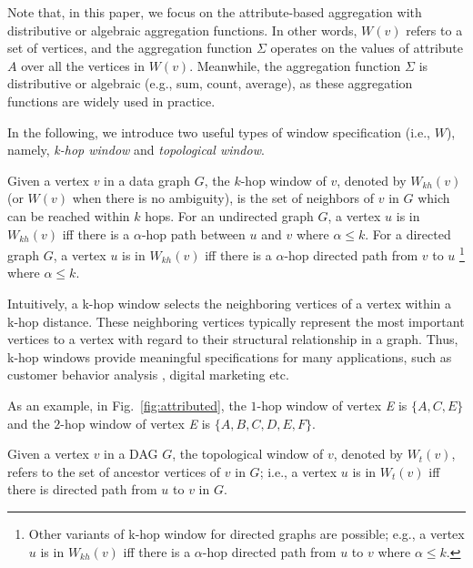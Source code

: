 Note that, in this paper, we focus on the attribute-based aggregation with distributive or algebraic aggregation functions. 
In other words, $W(v)$ refers to a set of vertices, and the aggregation function 
$\Sigma$ operates on the values of attribute $A$ over all the vertices in $W(v)$. Meanwhile, the aggregation function $\Sigma$ is distributive or algebraic (e.g., sum, count, average), as these aggregation functions are widely used in practice. 
 
In the following, we introduce two useful types of window specification (i.e., $W$), namely, 
\emph{k-hop window} and \emph{topological window}.


\begin{definition} 
Given a vertex $v$ in a data graph $G$, 
the $k$-hop window of $v$, denoted by $W_{kh}(v)$ (or $W(v)$ when there is no ambiguity),
is the set of neighbors of $v$ in $G$ which can be reached within $k$ hops.
For an undirected graph $G$,
a vertex $u$ is in $W_{kh}(v)$  iff there is a $\alpha$-hop path between $u$ and $v$ where $\alpha \leqslant k$.
For a directed graph $G$,
a vertex $u$ is in $W_{kh}(v)$  iff there is a $\alpha$-hop directed path from $v$ to $u$ \footnote{
Other variants of k-hop window for directed graphs are possible; e.g.,
a vertex $u$ is in $W_{kh}(v)$  iff there is a $\alpha$-hop directed path from $u$ to $v$ where $\alpha \leqslant k$.
} where $\alpha \leqslant k$.
\end{definition}

Intuitively, a k-hop window selects the neighboring vertices of a 
vertex within a  k-hop distance. 
These neighboring vertices typically represent the most important 
vertices to a vertex with regard to their structural relationship in a graph. 
Thus, k-hop windows provide meaningful specifications for many applications, such as customer behavior analysis \cite{Briscoe2013Credit,Dai2012Predict} , digital marketing \cite{Ma2009Marketing} etc.

As an example, in Fig.~\ref{fig:attributed}, the $1$-hop window of vertex \emph{E} is $\{A,C,E\}$ and the $2$-hop window of vertex \emph{E} is $\{A,B,C,D,E,F\}$.  

\begin{definition} 
Given a vertex $v$ in a DAG $G$, the topological window of $v$, denoted by $W_t(v)$,
refers to the set of ancestor vertices  of $v$ in $G$;
i.e., a vertex $u$ is in $W_t(v)$ iff there is directed path from $u$ to $v$ in $G$.
\end{definition}

